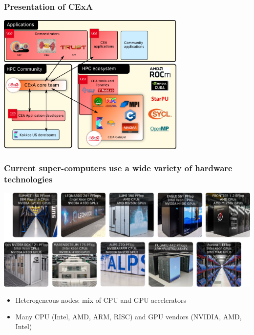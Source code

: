 \documentclass[aspectratio=169]{beamer}
\begin{document}
\begin{frame}
\frametitle{Presentation of CExA}

\begin{center}
    \includegraphics[width=0.7\textwidth]{../../images/cexa.png}
\end{center}

\end{frame}


\begin{frame}
\frametitle{Current super-computers use a wide variety of hardware technologies}

\begin{center}
    \includegraphics[width=1\textwidth]{../../images/top10_super_computers.png}
\end{center}


\begin{itemize}
\item Heterogeneous nodes: mix of CPU and GPU accelerators
\item Many CPU (Intel, AMD, ARM, RISC) and GPU vendors (NVIDIA, AMD, Intel)
\end{itemize}

\end{frame}
\end{document}
